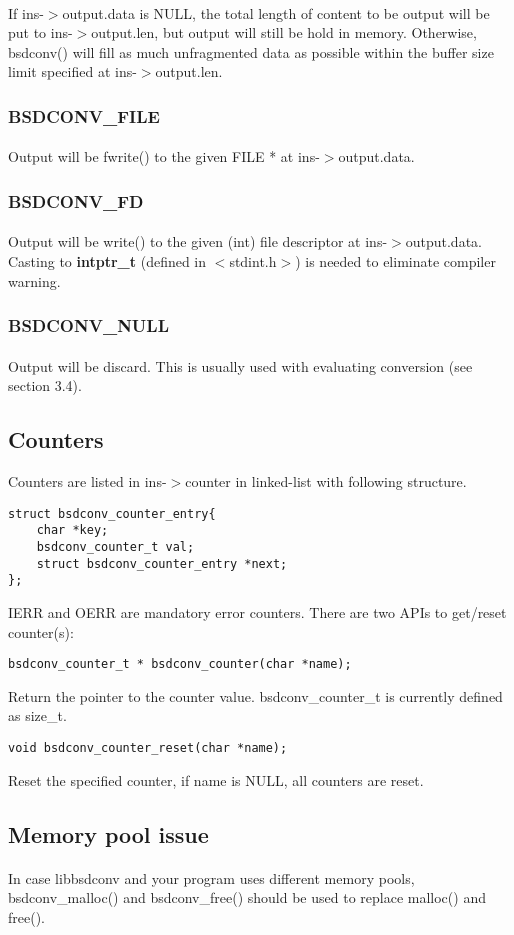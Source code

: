 \documentclass{article}
\begin{document}
				\paragraph{}
				If ins-$>$output.data is NULL, the total length of content to be output will be put to ins-$>$output.len, but output will still be hold in memory. Otherwise, bsdconv() will fill as much unfragmented data as possible within the buffer size limit specified at ins-$>$output.len.
			\subsubsection{BSDCONV\_FILE}
				\paragraph{}
				Output will be fwrite() to the given FILE * at ins-$>$output.data.
			\subsubsection{BSDCONV\_FD}
				\paragraph{}
				Output will be write() to the given (int) file descriptor at ins-$>$output.data. Casting to \textbf{intptr\_t} (defined in $<$stdint.h$>$) is needed to eliminate compiler warning.
			\subsubsection{BSDCONV\_NULL}
				\paragraph{}
				Output will be discard. This is usually used with evaluating conversion (see section 3.4).

		\subsection{Counters}
			Counters are listed in ins-$>$counter in linked-list with following structure.
			\begin{lstlisting}
struct bsdconv_counter_entry{
	char *key;
	bsdconv_counter_t val;
	struct bsdconv_counter_entry *next;
};
			\end{lstlisting}
			IERR and OERR are mandatory error counters.
			\newpage\noindent
			There are two APIs to get/reset counter(s):
			\begin{lstlisting}
bsdconv_counter_t * bsdconv_counter(char *name);
			\end{lstlisting}
			Return the pointer to the counter value. bsdconv\_counter\_t is currently defined as size\_t.
			\begin{lstlisting}
void bsdconv_counter_reset(char *name);
			\end{lstlisting}
			Reset the specified counter, if name is NULL, all counters are reset.
		\subsection{Memory pool issue}
			\paragraph{}
			In case libbsdconv and your program uses different memory pools, bsdconv\_malloc() and bsdconv\_free() should be used to replace malloc() and free().
\end{document}
